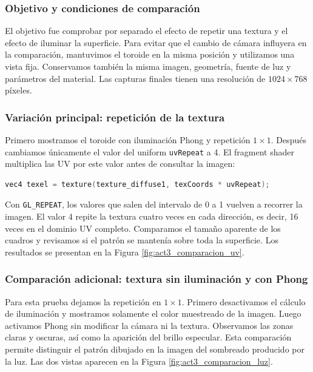 \subsubsection{Objetivo y condiciones de comparación}

El objetivo fue comprobar por separado el efecto de repetir una textura y el efecto de iluminar la superficie. Para evitar que el cambio de cámara influyera en la comparación, mantuvimos el toroide en la misma posición y utilizamos una vista fija. Conservamos también la misma imagen, geometría, fuente de luz y parámetros del material. Las capturas finales tienen una resolución de $1024\times768$ píxeles.

\subsubsection{Variación principal: repetición de la textura}

Primero mostramos el toroide con iluminación Phong y repetición $1\times1$. Después cambiamos únicamente el valor del uniform \texttt{uvRepeat} a 4. El fragment shader multiplica las UV por este valor antes de consultar la imagen:

\begin{lstlisting}[language=C, caption={Muestreo de la textura con un factor de repetición.}, label={lst:act3_repeticion}]
vec4 texel = texture(texture_diffuse1, texCoords * uvRepeat);
\end{lstlisting}

Con \texttt{GL\_REPEAT}, los valores que salen del intervalo de 0 a 1 vuelven a recorrer la imagen. El valor 4 repite la textura cuatro veces en cada dirección, es decir, 16 veces en el dominio UV completo. Comparamos el tamaño aparente de los cuadros y revisamos si el patrón se mantenía sobre toda la superficie. Los resultados se presentan en la Figura \ref{fig:act3_comparacion_uv}.

\subsubsection{Comparación adicional: textura sin iluminación y con Phong}

Para esta prueba dejamos la repetición en $1\times1$. Primero desactivamos el cálculo de iluminación y mostramos solamente el color muestreado de la imagen. Luego activamos Phong sin modificar la cámara ni la textura. Observamos las zonas claras y oscuras, así como la aparición del brillo especular. Esta comparación permite distinguir el patrón dibujado en la imagen del sombreado producido por la luz. Las dos vistas aparecen en la Figura \ref{fig:act3_comparacion_luz}.

